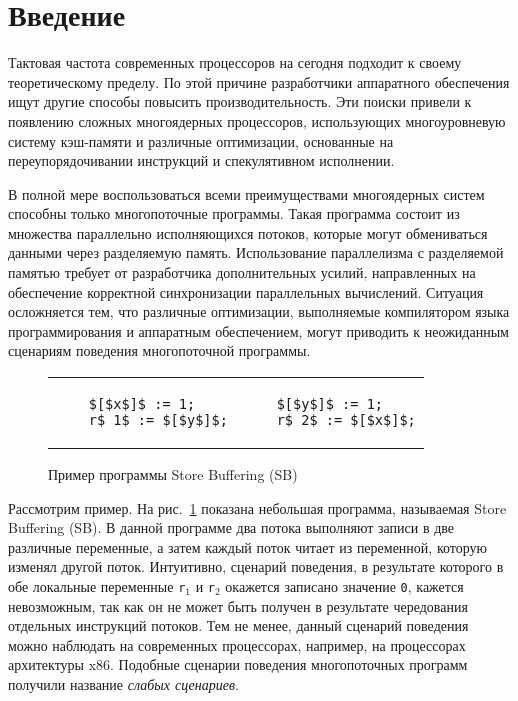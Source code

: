 \section*{Введение}

Тактовая частота современных процессоров 
на сегодня подходит к своему теоретическому пределу. 
По этой причине разработчики аппаратного обеспечения 
ищут другие способы повысить производительность.
Эти поиски привели к появлению сложных многоядерных процессоров,
использующих многоуровневую систему кэш-памяти и 
различные оптимизации, основанные на переупорядочивании инструкций
и спекулятивном исполнении.

В полной мере воспользоваться всеми преимуществами многоядерных систем
способны только многопоточные программы.
Такая программа состоит из множества параллельно исполняющихся потоков,
которые могут обмениваться данными через разделяемую память.
Использование параллелизма с разделяемой памятью
требует от разработчика дополнительных усилий, 
направленных на обеспечение корректной синхронизации параллельных вычислений.
Ситуация осложняется тем, что различные оптимизации, 
выполняемые компилятором языка программирования и аппаратным обеспечением,
могут приводить к неожиданным сценариям поведения многопоточной программы.

\begin{figure}[htp]
\centering
    \begin{tabular}{l|@{\hskip 5pt}|@{\hskip -15pt}l}
    \begin{lstlisting}
    $[$x$]$ := 1;
    r$_1$ := $[$y$]$;
    \end{lstlisting}
    &
    \begin{lstlisting}
    $[$y$]$ := 1;
    r$_2$ := $[$x$]$;
    \end{lstlisting}
    \\
    \end{tabular}
    \caption{Пример программы Store Buffering (SB)}
    \label{lst:sb-ex-1}
\end{figure}

Рассмотрим пример. 
На рис.~\ref{lst:sb-ex-1} показана небольшая программа, 
называемая Store Buffering (SB).
В данной программе два потока выполняют записи в две различные переменные, 
а затем каждый поток читает из переменной, которую изменял другой поток.
Интуитивно, сценарий поведения, в результате которого в обе локальные переменные 
\texttt{r$_1$} и \texttt{r$_2$} окажется записано значение \texttt{0}, кажется невозможным,
так как он не может быть получен в результате чередования отдельных инструкций потоков.
Тем не менее, данный сценарий поведения можно наблюдать на современных процессорах, 
например, на процессорах архитектуры x86.
Подобные сценарии поведения многопоточных программ получили название \emph{слабых сценариев}.


